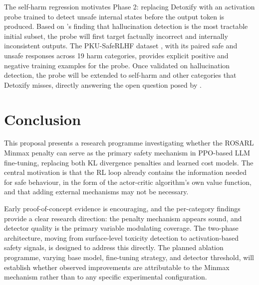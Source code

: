 \documentclass[a4paper,twoside,12pt]{report}
\begin{document}
The self-harm regression motivates Phase 2: replacing Detoxify with an activation probe
trained to detect unsafe internal states before the output token is produced. Based on
\citet{rateike2023}'s finding that hallucination detection is the most tractable initial
subset, the probe will first target factually incorrect and internally inconsistent outputs.
The PKU-SafeRLHF dataset \citep{ji2024pkusaferlhf}, with its paired safe and unsafe
responses across 19 harm categories, provides explicit positive and negative training
examples for the probe. Once validated on hallucination detection, the probe will be extended
to self-harm and other categories that Detoxify misses, directly answering the open question
posed by \citet{cintas2025}.

\chapter{Conclusion}
\label{ch:conclusion}

This proposal presents a research programme investigating whether the ROSARL Minmax penalty
can serve as the primary safety mechanism in PPO-based LLM fine-tuning, replacing both KL
divergence penalties and learned cost models. The central motivation is that the RL loop
already contains the information needed for safe behaviour, in the form of the actor-critic
algorithm's own value function, and that adding external mechanisms may not be necessary.

Early proof-of-concept evidence is encouraging, and the per-category findings provide a
clear research direction: the penalty mechanism appears sound, and detector quality is the
primary variable modulating coverage. The two-phase architecture, moving from surface-level
toxicity detection to activation-based safety signals, is designed to address this directly.
The planned ablation programme, varying base model, fine-tuning strategy, and detector
threshold, will establish whether observed improvements are attributable to the Minmax
mechanism rather than to any specific experimental configuration.
\end{document}
